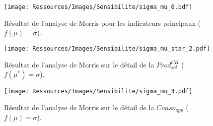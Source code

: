 
\vfill
\begin{figure}
    \centering
    \texttt{[image: Ressources/Images/Sensibilite/sigma\_mu\_0.pdf]}
    \caption[Résultat de l’analyse de Morris pour les indicateurs principaux
             ($f(\mu) = \sigma$)]
            {Résultat de l’analyse de Morris pour les indicateurs principaux
             ($f(\mu) = \sigma$).}
    \label{fig:objectifs_mu}
\end{figure}

\begin{figure}
    \centering
    \texttt{[image: Ressources/Images/Sensibilite/sigma\_mu\_star\_2.pdf]}
    \caption[Résultat de l’analyse de Morris sur le détail de la
             $Prod_{sol}^{CH}$ ($f(\mu^{*}) = \sigma$)]
            {Résultat de l’analyse de Morris sur le détail de la
             $Prod_{sol}^{CH}$ ($f(\mu^{*}) = \sigma$).}
    \label{fig:prod_sol_chauffage_mu_star}
\end{figure}




\begin{figure}
    \centering
    \texttt{[image: Ressources/Images/Sensibilite/sigma\_mu\_3.pdf]}
    \caption[Résultat de l’analyse de Morris sur le détail de la
             $Conso_{app}$ ($f(\mu) = \sigma$)]
            {Résultat de l’analyse de Morris sur le détail de la
             $Conso_{app}$ ($f(\mu) = \sigma$).}
    \label{fig:conso_app_mu}
\end{figure}

